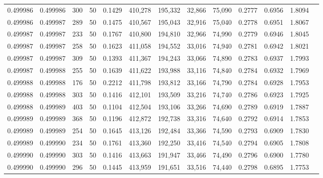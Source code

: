 \begin{tabular}{rrrrrrrrrrrrr}
0.499986 & 0.499986 &   300 &  50 &                                     0.1429 & 410,278 & 195,332 &  32,866 &  75,090 & 0.2777 & 0.6956 & 1.8094 \\
0.499986 & 0.499987 &   289 &  50 &                                     0.1475 & 410,567 & 195,043 &  32,916 &  75,040 & 0.2778 & 0.6951 & 1.8067 \\
0.499987 & 0.499987 &   233 &  50 &                                     0.1767 & 410,800 & 194,810 &  32,966 &  74,990 & 0.2779 & 0.6946 & 1.8045 \\
0.499987 & 0.499987 &   258 &  50 &                                     0.1623 & 411,058 & 194,552 &  33,016 &  74,940 & 0.2781 & 0.6942 & 1.8021 \\
0.499987 & 0.499987 &   309 &  50 &                                     0.1393 & 411,367 & 194,243 &  33,066 &  74,890 & 0.2783 & 0.6937 & 1.7993 \\
0.499987 & 0.499988 &   255 &  50 &                                     0.1639 & 411,622 & 193,988 &  33,116 &  74,840 & 0.2784 & 0.6932 & 1.7969 \\
0.499988 & 0.499988 &   176 &  50 &                                     0.2212 & 411,798 & 193,812 &  33,166 &  74,790 & 0.2784 & 0.6928 & 1.7953 \\
0.499988 & 0.499988 &   303 &  50 &                                     0.1416 & 412,101 & 193,509 &  33,216 &  74,740 & 0.2786 & 0.6923 & 1.7925 \\
0.499988 & 0.499989 &   403 &  50 &                                     0.1104 & 412,504 & 193,106 &  33,266 &  74,690 & 0.2789 & 0.6919 & 1.7887 \\
0.499989 & 0.499989 &   368 &  50 &                                     0.1196 & 412,872 & 192,738 &  33,316 &  74,640 & 0.2792 & 0.6914 & 1.7853 \\
0.499989 & 0.499989 &   254 &  50 &                                     0.1645 & 413,126 & 192,484 &  33,366 &  74,590 & 0.2793 & 0.6909 & 1.7830 \\
0.499989 & 0.499990 &   234 &  50 &                                     0.1761 & 413,360 & 192,250 &  33,416 &  74,540 & 0.2794 & 0.6905 & 1.7808 \\
0.499990 & 0.499990 &   303 &  50 &                                     0.1416 & 413,663 & 191,947 &  33,466 &  74,490 & 0.2796 & 0.6900 & 1.7780 \\
0.499990 & 0.499990 &   296 &  50 &                                     0.1445 & 413,959 & 191,651 &  33,516 &  74,440 & 0.2798 & 0.6895 & 1.7753 \\

\end{tabular}
